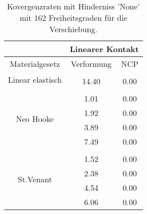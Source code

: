 \begin{table} 
\centering 
\begin{tabular}{c|cc|} 
\cline{2-3} 
 & \multicolumn{2}{|c|}{Linearer Kontakt} \\ 
\hline 
\multicolumn{1}{|c|}{Materialgesetz} & \multicolumn{1}{c|}{Verformung} & \multicolumn{1}{c|}{NCP} \\ 
\hline 
\multicolumn{1}{|c|}{\multirow{2}{*}{Linear elastisch}} &\multicolumn{1}{|c|}{} & \multicolumn{1}{|c|}{} \\ 
\multicolumn{1}{|c|}{} & \multicolumn{1}{|c|}{     14.40} & \multicolumn{1}{|c|}{      0.00} \\ 
\hline 
\multicolumn{1}{|c|}{\multirow{5}{*}{Neo Hooke}} &\multicolumn{1}{|c|}{} & \multicolumn{1}{|c|}{} \\ 
\multicolumn{1}{|c|}{} & \multicolumn{1}{|c|}{      1.01} & \multicolumn{1}{|c|}{      0.00} \\ 
\multicolumn{1}{|c|}{} & \multicolumn{1}{|c|}{      1.92} & \multicolumn{1}{|c|}{      0.00} \\ 
\multicolumn{1}{|c|}{} & \multicolumn{1}{|c|}{      3.89} & \multicolumn{1}{|c|}{      0.00} \\ 
\multicolumn{1}{|c|}{} & \multicolumn{1}{|c|}{      7.49} & \multicolumn{1}{|c|}{      0.00} \\ 
\hline 
\multicolumn{1}{|c|}{\multirow{5}{*}{St.Venant}} &\multicolumn{1}{|c|}{} & \multicolumn{1}{|c|}{} \\ 
\multicolumn{1}{|c|}{} & \multicolumn{1}{|c|}{      1.52} & \multicolumn{1}{|c|}{      0.00} \\ 
\multicolumn{1}{|c|}{} & \multicolumn{1}{|c|}{      2.38} & \multicolumn{1}{|c|}{      0.00} \\ 
\multicolumn{1}{|c|}{} & \multicolumn{1}{|c|}{      4.54} & \multicolumn{1}{|c|}{      0.00} \\ 
\multicolumn{1}{|c|}{} & \multicolumn{1}{|c|}{      6.06} & \multicolumn{1}{|c|}{      0.00} \\ 
\hline 
\end{tabular}\caption{Kovergenzraten mit Hinderniss 'None' mit 162 Freiheitsgraden für die Verschiebung.}\label{tab:Rate_None_level2}
\end{table} 
